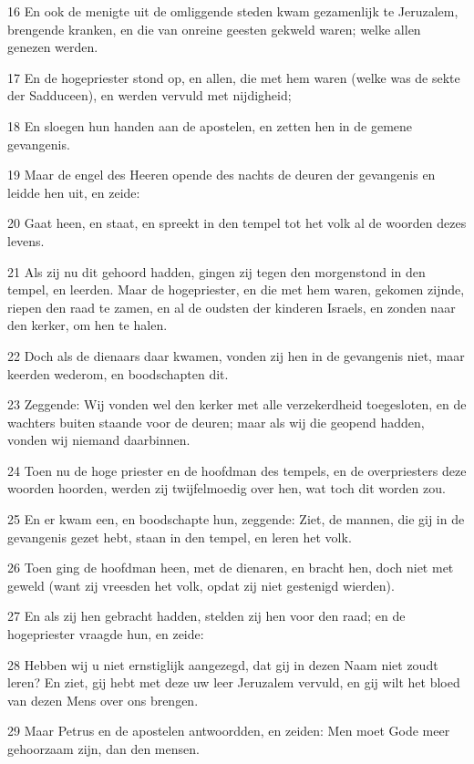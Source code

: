 \par 16 En ook de menigte uit de omliggende steden kwam gezamenlijk te Jeruzalem, brengende kranken, en die van onreine geesten gekweld waren; welke allen genezen werden.
\par 17 En de hogepriester stond op, en allen, die met hem waren (welke was de sekte der Sadduceen), en werden vervuld met nijdigheid;
\par 18 En sloegen hun handen aan de apostelen, en zetten hen in de gemene gevangenis.
\par 19 Maar de engel des Heeren opende des nachts de deuren der gevangenis en leidde hen uit, en zeide:
\par 20 Gaat heen, en staat, en spreekt in den tempel tot het volk al de woorden dezes levens.
\par 21 Als zij nu dit gehoord hadden, gingen zij tegen den morgenstond in den tempel, en leerden. Maar de hogepriester, en die met hem waren, gekomen zijnde, riepen den raad te zamen, en al de oudsten der kinderen Israels, en zonden naar den kerker, om hen te halen.
\par 22 Doch als de dienaars daar kwamen, vonden zij hen in de gevangenis niet, maar keerden wederom, en boodschapten dit.
\par 23 Zeggende: Wij vonden wel den kerker met alle verzekerdheid toegesloten, en de wachters buiten staande voor de deuren; maar als wij die geopend hadden, vonden wij niemand daarbinnen.
\par 24 Toen nu de hoge priester en de hoofdman des tempels, en de overpriesters deze woorden hoorden, werden zij twijfelmoedig over hen, wat toch dit worden zou.
\par 25 En er kwam een, en boodschapte hun, zeggende: Ziet, de mannen, die gij in de gevangenis gezet hebt, staan in den tempel, en leren het volk.
\par 26 Toen ging de hoofdman heen, met de dienaren, en bracht hen, doch niet met geweld (want zij vreesden het volk, opdat zij niet gestenigd wierden).
\par 27 En als zij hen gebracht hadden, stelden zij hen voor den raad; en de hogepriester vraagde hun, en zeide:
\par 28 Hebben wij u niet ernstiglijk aangezegd, dat gij in dezen Naam niet zoudt leren? En ziet, gij hebt met deze uw leer Jeruzalem vervuld, en gij wilt het bloed van dezen Mens over ons brengen.
\par 29 Maar Petrus en de apostelen antwoordden, en zeiden: Men moet Gode meer gehoorzaam zijn, dan den mensen.
